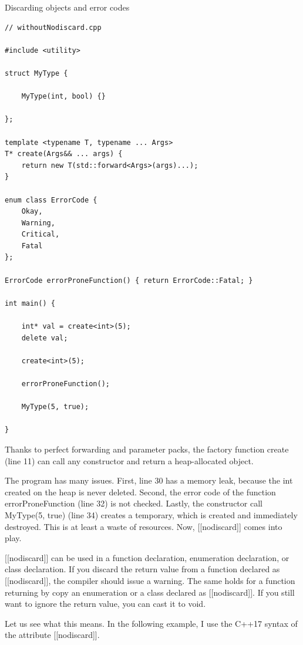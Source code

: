 \noindent
Discarding objects and error codes
\begin{lstlisting}[style=styleCXX]
// withoutNodiscard.cpp

#include <utility>

struct MyType {

	MyType(int, bool) {}

};

template <typename T, typename ... Args>
T* create(Args&& ... args) {
	return new T(std::forward<Args>(args)...);
}

enum class ErrorCode {
	Okay,
	Warning,
	Critical,
	Fatal
};

ErrorCode errorProneFunction() { return ErrorCode::Fatal; }

int main() {

	int* val = create<int>(5);
	delete val;
	
	create<int>(5);
	
	errorProneFunction();
	
	MyType(5, true);

}
\end{lstlisting}

Thanks to perfect forwarding and parameter packs, the factory function create (line 11) can call any constructor and return a heap-allocated object.

The program has many issues. First, line 30 has a memory leak, because the int created on the heap is never deleted. Second, the error code of the function errorProneFunction (line 32) is not checked. Lastly, the constructor call MyType(5, true) (line 34) creates a temporary, which is created and immediately destroyed. This is at least a waste of resources. Now, [[nodiscard]] comes into play.

[[nodiscard]] can be used in a function declaration, enumeration declaration, or class declaration. If you discard the return value from a function declared as [[nodiscard]], the compiler should issue a warning. The same holds for a function returning by copy an enumeration or a class declared as [[nodiscard]]. If you still want to ignore the return value, you can cast it to void.

Let us see what this means. In the following example, I use the C++17 syntax of the attribute [[nodiscard]].

